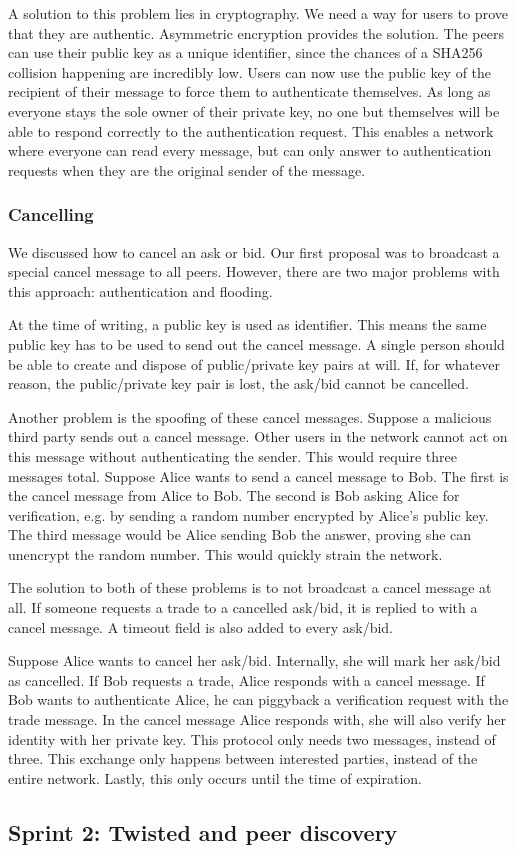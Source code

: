 \documentclass[]{article}
\begin{document}
A solution to this problem lies in cryptography.
We need a way for users to prove that they are authentic.
Asymmetric encryption provides the solution.
The peers can use their public key as a unique identifier, since the chances of a SHA256 collision happening are incredibly low.
Users can now use the public key of the recipient of their message to force them to authenticate themselves.
As long as everyone stays the sole owner of their private key, no one but themselves will be able to respond correctly to the authentication request.
This enables a network where everyone can read every message, but can only answer to authentication requests when they are the original sender of the message.


\subsubsection{Cancelling}
We discussed how to cancel an ask or bid.
Our first proposal was to broadcast a special cancel message to all peers.
However, there are two major problems with this approach: authentication and flooding.


At the time of writing, a public key is used as identifier.
This means the same public key has to be used to send out the cancel message.
A single person should be able to create and dispose of public/private key pairs at will.
If, for whatever reason, the public/private key pair is lost, the ask/bid cannot be cancelled.


Another problem is the spoofing of these cancel messages.
Suppose a malicious third party sends out a cancel message.
Other users in the network cannot act on this message without authenticating the sender.
This would require three messages total.
Suppose Alice wants to send a cancel message to Bob.
The first is the cancel message from Alice to Bob.
The second is Bob asking Alice for verification, e.g.
by sending a random number encrypted by Alice's public key.
The third message would be Alice sending Bob the answer, proving she can unencrypt the random number.
This would quickly strain the network.


The solution to both of these problems is to not broadcast a cancel message at all.
If someone requests a trade to a cancelled ask/bid, it is replied to with a cancel message.
A timeout field is also added to every ask/bid.


Suppose Alice wants to cancel her ask/bid.
Internally, she will mark her ask/bid as cancelled.
If Bob requests a trade, Alice responds with a cancel message.
If Bob wants to authenticate Alice, he can piggyback a verification request with the trade message.
In the cancel message Alice responds with, she will also verify her identity with her private key.
This protocol only needs two messages, instead of three.
This exchange only happens between interested parties, instead of the entire network.
Lastly, this only occurs until the time of expiration.

\subsection{Sprint 2: Twisted and peer discovery}

\end{document}
